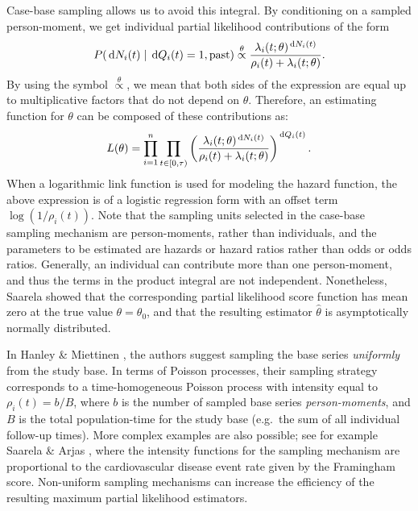 Case-base sampling allows us to avoid this integral. By conditioning on
a sampled person-moment, we get individual partial likelihood
contributions of the form
\[P(\,\textrm dN_{i}(t) \mid \,\textrm dQ_{i}(t) = 1,\mathrm{past}) \stackrel{\theta}{\propto} \frac{\lambda_{i}(t; \theta)^{\,\textrm dN_{i}(t)}}{\rho_i(t) + \lambda_{i}(t;\theta)}.\]
By using the symbol \(\stackrel{\theta}{\propto}\), we mean that both
sides of the expression are equal up to multiplicative factors that do
not depend on \(\theta\). Therefore, an estimating function for
\(\theta\) can be composed of these contributions as: \begin{equation}
L(\theta) = \prod_{i=1}^{n} \prod_{t\in[0,\tau)} \left(\frac{\lambda_{i}(t; \theta)^{\,\textrm dN_{i}(t)}}{\rho_i(t) + \lambda_{i}(t;\theta)}\right)^{\,\textrm dQ_i(t)}. \label{eq:lik-function}
\end{equation} When a logarithmic link function is used for modeling the
hazard function, the above expression is of a logistic regression form
with an offset term \(\log(1/\rho_i(t))\). Note that the sampling units
selected in the case-base sampling mechanism are person-moments, rather
than individuals, and the parameters to be estimated are hazards or
hazard ratios rather than odds or odds ratios. Generally, an individual
can contribute more than one person-moment, and thus the terms in the
product integral are not independent. Nonetheless, Saarela
\citeyearpar{saarela2016case} showed that the corresponding partial
likelihood score function has mean zero at the true value
\(\theta=\theta_0\), and that the resulting estimator \(\hat{\theta}\)
is asymptotically normally distributed.

In Hanley \& Miettinen \citeyearpar{hanley2009fitting}, the authors
suggest sampling the base series \emph{uniformly} from the study base.
In terms of Poisson processes, their sampling strategy corresponds to a
time-homogeneous Poisson process with intensity equal to
\(\rho_i(t) = b/B\), where \(b\) is the number of sampled base series
\emph{person-moments}, and \(B\) is the total population-time for the
study base (e.g.~the sum of all individual follow-up times). More
complex examples are also possible; see for example Saarela \& Arjas
\citeyearpar{saarela2015non}, where the intensity functions for the
sampling mechanism are proportional to the cardiovascular disease event
rate given by the Framingham score. Non-uniform sampling mechanisms can
increase the efficiency of the resulting maximum partial likelihood
estimators.

